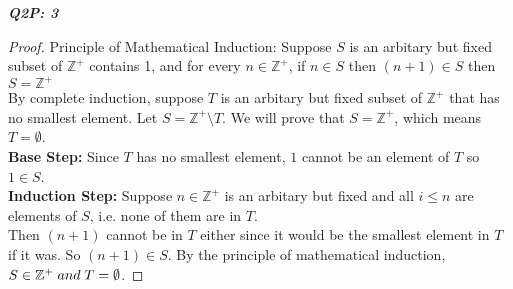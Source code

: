 \documentclass{article}
\begin{document}
\begin{flushleft}
\begin{enumerate}
		\textbf{\textit{Q2P: 3}}
		\begin{flushleft}
			\begin{proof}
				Principle of Mathematical Induction: Suppose $S$ is an arbitary but fixed subset of $\mathbb{Z^+}$ contains 1, and for every $n \in \mathbb{Z^+}$, if $n \in S$ then $(n+1) \in S$ then $S = \mathbb{Z^+}$ 
				\\ \vspace{2mm}
				By complete induction, suppose $T$ is an arbitary but fixed subset of $\mathbb{Z^+}$ that has no smallest element. Let $S = \mathbb{Z^+} \setminus T$. We will prove that $S= \mathbb{Z^+}$, which means $T = \emptyset$.
				\\ \vspace{2mm}
				\textbf{Base Step:} Since $T$ has no smallest element, $1$ cannot be an element of $T$ so $1 \in S$.
				\\ \vspace{2mm}
				\textbf{Induction Step:} Suppose $n \in \mathbb{Z^+}$ is an arbitary but fixed and all $i \leq n$ are elements of $S$, i.e. none of them are in $T$. \\
				Then $(n+1)$ cannot be in $T$ either since it would be the smallest element in $T$ if it was. So $(n+1) \in S$. By the principle of mathematical induction, $S \in \mathbb{Z^+} \thickspace and \thickspace T = \emptyset$.
			\end{proof}
		\end{flushleft}
		
		\end{enumerate}
	\end{flushleft}
\end{document}
